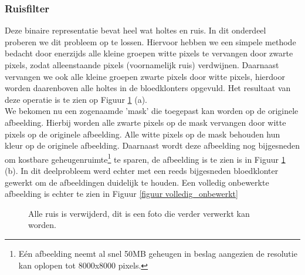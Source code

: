 \documentclass[a4paper,kulak]{kulakarticle}
\begin{document}
\subsubsection{Ruisfilter}
Deze binaire representatie bevat heel wat holtes en ruis. In dit onderdeel proberen we dit probleem op te lossen. Hiervoor hebben we een simpele methode bedacht door enerzijds alle kleine groepen witte pixels te vervangen door zwarte pixels, zodat alleenstaande pixels (voornamelijk ruis) verdwijnen. Daarnaast vervangen we ook alle kleine groepen zwarte pixels door witte pixels, hierdoor worden daarenboven alle holtes in de bloedklonters opgevuld. Het resultaat van deze operatie is te zien op Figuur \ref{figuur ruisfilter} (a). \\
We bekomen nu een zogenaamde 'mask' die toegepast kan worden op de originele afbeelding. Hierbij worden alle zwarte pixels op de mask vervangen door witte pixels op de originele afbeelding. Alle witte pixels op de mask behouden hun kleur op de originele afbeelding. Daarnaast wordt deze afbeelding nog bijgesneden om kostbare geheugenruimte\footnote{Eén afbeelding neemt al snel 50MB geheugen in beslag aangezien de resolutie kan oplopen tot 8000x8000 pixels.} te sparen, de afbeelding is te zien is in Figuur \ref{figuur ruisfilter} (b). In dit deelprobleem werd echter met een reeds bijgesneden bloedklonter gewerkt om de afbeeldingen duidelijk te houden. Een volledig onbewerkte afbeelding is echter te zien in Figuur \ref{figuur volledig_onbewerkt}

\begin{figure}[H]
	\centering
	\qquad
	
	\caption{Alle ruis is verwijderd, dit is een foto die verder verwerkt kan worden.}
	\label{figuur ruisfilter}
\end{figure}
\end{document}
